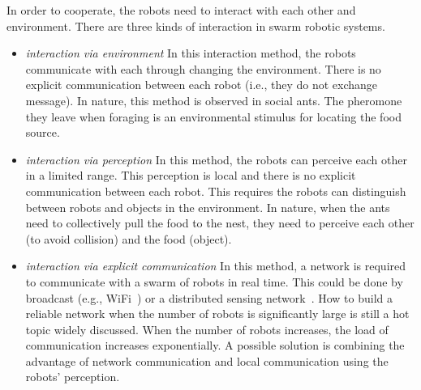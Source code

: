 In order to cooperate, the robots need to interact with each other and environment. There are three kinds of interaction in swarm robotic systems. 

\begin{itemize}

\item \textit{interaction via environment} In this interaction method, the robots communicate with each through changing the environment. There is no explicit communication between each robot (i.e., they do not exchange message). In nature, this method is observed in social ants. The pheromone they leave when foraging is an environmental stimulus for locating the food source.  

\item \textit{interaction via perception} In this method, the robots can perceive each other in a limited range. This perception is local and there is no explicit communication between each robot. This requires the robots can distinguish between robots and objects in the environment. In nature, when the ants need to collectively pull the food to the nest, they need to perceive each other (to avoid collision) and the food (object).

\item \textit{interaction via explicit communication} In this method, a network is required to communicate with a swarm of robots in real time. This could be done by broadcast (e.g., WiFi~\cite{Gerkey:TRA:2002}) or a distributed sensing network~\cite{Winfield:LNCS:2000}. How to build a reliable network when the number of robots is significantly large is still a hot topic widely discussed. When the number of robots increases, the load of communication increases exponentially. A possible solution is combining the advantage of network communication and local communication using the robots' perception.

\end{itemize}

